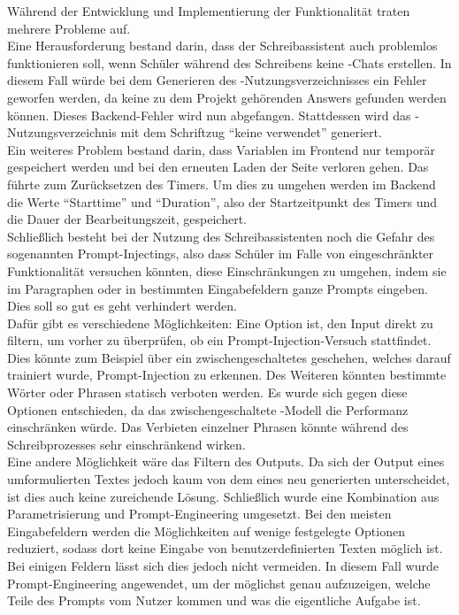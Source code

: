 \documentclass[../main.tex]{subfiles}
\begin{document}
Während der Entwicklung und Implementierung der Funktionalität traten mehrere Probleme auf.\\
Eine Herausforderung bestand darin, dass der Schreibassistent auch problemlos funktionieren soll, wenn Schüler während des Schreibens keine -Chats erstellen. In diesem Fall würde 
bei dem Generieren des -Nutzungsverzeichnisses ein Fehler geworfen werden, da keine zu dem Projekt gehörenden Answers gefunden werden können. Dieses Backend-Fehler wird nun 
abgefangen. Stattdessen wird  das -Nutzungsverzeichnis mit dem Schriftzug "`keine  verwendet"' generiert.\\
Ein weiteres Problem bestand darin, dass Variablen im Frontend nur temporär gespeichert werden und bei den erneuten Laden der Seite verloren gehen. Das führte zum Zurücksetzen des 
Timers. Um dies zu umgehen werden im Backend die Werte "`Starttime"' und "`Duration"', also der Startzeitpunkt des Timers und die Dauer der Bearbeitungszeit, gespeichert.\\ 
Schließlich besteht bei der Nutzung des Schreibassistenten noch die Gefahr des sogenannten Prompt-Injectings, also dass Schüler im Falle von eingeschränkter Funktionalität versuchen 
könnten, diese Einschränkungen zu umgehen, indem sie im Paragraphen oder in bestimmten Eingabefeldern ganze Prompts eingeben. Dies soll so gut es geht verhindert werden.\\ 
Dafür gibt es verschiedene Möglichkeiten: Eine Option ist, den Input direkt zu filtern, um vorher zu überprüfen, ob ein Prompt-Injection-Versuch stattfindet. Dies könnte zum Beispiel 
über ein zwischengeschaltetes  geschehen, welches darauf trainiert wurde, Prompt-Injection zu erkennen. Des Weiteren könnten bestimmte Wörter oder Phrasen statisch verboten werden. 
Es wurde sich gegen diese Optionen entschieden, da das zwischengeschaltete -Modell die Performanz einschränken würde. Das Verbieten einzelner Phrasen könnte während des 
Schreibprozesses sehr einschränkend wirken.\cite{promptinjection}\\
Eine andere Möglichkeit wäre das Filtern des Outputs. Da sich der Output eines umformulierten Textes jedoch kaum von dem eines neu generierten unterscheidet, ist dies auch keine 
zureichende Lösung. Schließlich wurde eine Kombination aus Parametrisierung und Prompt-Engineering umgesetzt. Bei den meisten Eingabefeldern werden die Möglichkeiten auf wenige 
festgelegte Optionen reduziert, sodass dort keine Eingabe von benutzerdefinierten Texten möglich ist. Bei einigen Feldern lässt sich dies jedoch nicht vermeiden. In diesem Fall wurde 
Prompt-Engineering angewendet, um der  möglichst genau aufzuzeigen, welche Teile des Prompts vom Nutzer kommen und was die eigentliche Aufgabe ist.\\
\end{document}
